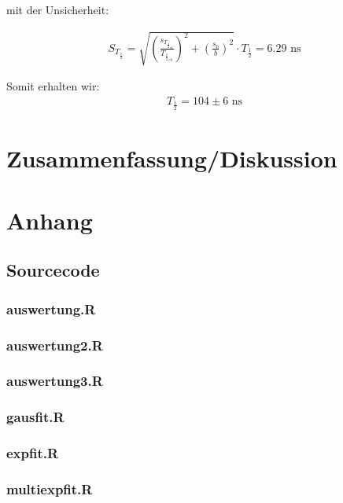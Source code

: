 \documentclass[12pt]{article}
\begin{document}
mit der Unsicherheit:

\begin{align*}
S_{T_{\frac12}} = \sqrt{\left(\frac{s_{T_{{\frac12}_{ch}}}}{T_{{\frac12}_{ch}}}\right)^2+\left(\frac{s_b}{b}\right)^2} \cdot T_{\frac12} = 6.29 \text{ ns}
\end{align*}

Somit erhalten wir:
\begin{align*}
T_{\frac12} = 104 \pm 6 \text{ ns}
\end{align*}

\section{Zusammenfassung/Diskussion}


\newpage
\section{Anhang}

\subsection{Sourcecode}
\subsubsection*{auswertung.R}

\subsubsection*{auswertung2.R}

\subsubsection*{auswertung3.R}

\subsubsection*{gausfit.R}

\subsubsection*{expfit.R}

\subsubsection*{multiexpfit.R}

\end{document}

